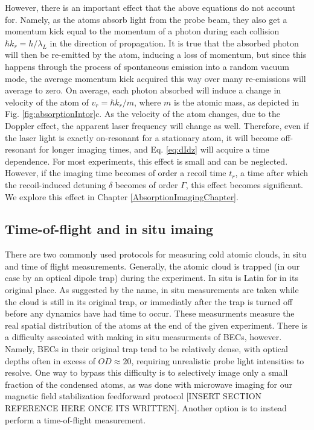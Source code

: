 However, there is an important effect that the above equations do not account for. Namely, as the atoms absorb light from the probe beam, they also get a momentum kick equal to the momentum of a photon during each collision $\hbar k_r=h/\lambda_L$ in the direction of propagation. It is true that the absorbed photon will then be re-emitted by the atom, inducing a loss of momentum, but since this happens through the process of spontaneous emission into a random vacuum mode, the average momentum kick acquired this way over many re-emissions will average to zero. On average, each photon absorbed will induce a change in velocity of the atom of $v_r=\hbar k_r/m$, where $m$ is the atomic mass, as depicted in Fig. \ref{fig:absorptionIntor}c. As the velocity of the atom changes, due to the Doppler effect, the apparent laser frequency will change as well. Therefore, even if the laser light is exactly on-resonant for a stationary atom, it will become off-resonant for longer imaging times, and Eq. \ref{eq:dIdz} will acquire a time dependence. For most experiments, this effect is small and can be neglected. However, if the imaging time becomes of order a recoil time $t_r$, a time after which the recoil-induced detuning $\delta$ becomes of order $\Gamma$, this effect becomes significant. We explore this effect in Chapter \ref{AbsorptionImagingChapter}.  

\subsection{Time-of-flight and in situ imaing}\label{sec:timeOfFlight}
There are two commonly used protocols for measuring cold atomic clouds, in situ and time of flight measurements. Generally, the atomic cloud is trapped (in our case by an optical dipole trap) during the experiment. In situ is Latin for in its original place. As suggested by the name, in situ measurements are taken while the cloud is still in its original trap, or immediatly after the trap is turned off before any dynamics have had time to occur. These measurments measure the real spatial distribution of the atoms at the end of the given experiment. There is a difficulty asscoiated with making in situ measurments of BECs, however. Namely, BECs in their original trap tend to be relatively dense, with optical depths often in excess of $OD\approx20$, requiring unrealistic probe light intensities to resolve. One way to bypass this difficulty is to selectively image only a small fraction of the condensed atoms, as was done with microwave imaging for our magnetic field stabilization feedforward protocol [INSERT SECTION REFERENCE HERE ONCE ITS WRITTEN]. Another option is to instead perform a time-of-flight measurement.


